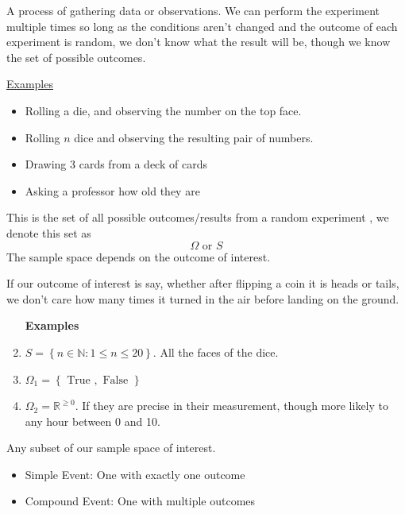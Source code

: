 \documentclass[11pt]{book}
\begin{document}
\begin{defn}\label{defn:random_experiment}
    A process of gathering data or observations. We can perform the experiment multiple times so long as the conditions aren't changed and the outcome of each experiment is random, we don't know what the result will be, though we know the set of possible outcomes. 
\end{defn}

\underline{Examples} 

\begin{itemize}
    \item Rolling a die, and observing the number on the top face. 
    \item Rolling $n$ dice and observing the resulting pair of numbers. 
    \item Drawing 3 cards from a deck of cards
    \item Asking a professor how old they are
\end{itemize}

\begin{defn}\label{defn:sample_space}
    This is the set of all possible outcomes/results from a random experiment , we denote this set as
    \[
    \Omega \text{ or } S
    \]
    The sample space depends on the outcome of interest.
\end{defn}

\begin{nt}
    If our outcome of interest is say, whether after flipping a coin it is heads or tails, we don't care how many times it turned in the air before landing on the ground.
\end{nt}

\begin{enumerate}
    \item [\textbf{Examples}] 
    \item $S = \left\{ n \in \mathbb{N} : 1 \le  n \le 20 \right\} $.  All the faces of the dice.
    \item $\Omega _{1} = \left\{ \text{ True } , \text{ False } \right\} $ 
    \item $\Omega _{2} = \mathbb{R} ^{\ge 0} $. If they are precise in their measurement, though more likely to any hour between 0 and 10. 
\end{enumerate}

\begin{defn}[Event]\label{defn:event}
    Any subset of our sample space of interest. 
    \begin{itemize}
        \item Simple Event: One with exactly one outcome
        \item Compound Event: One with multiple outcomes 
    \end{itemize}
\end{defn}
\end{document}
